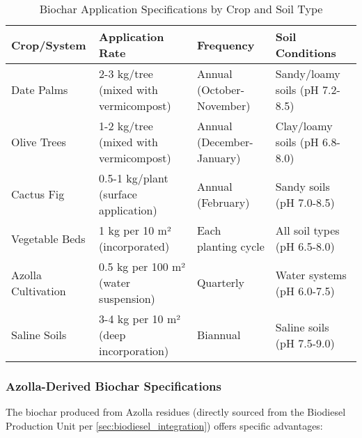\begin{table}[h]
\centering
\begin{tabular}{|p{3cm}|p{3cm}|p{3cm}|p{3cm}|}
\hline
\textbf{Crop/System} & \textbf{Application Rate} & \textbf{Frequency} & \textbf{Soil Conditions} \\
\hline
Date Palms & 2-3 kg/tree (mixed with vermicompost) & Annual (October-November) & Sandy/loamy soils (pH 7.2-8.5) \\
\hline
Olive Trees & 1-2 kg/tree (mixed with vermicompost) & Annual (December-January) & Clay/loamy soils (pH 6.8-8.0) \\
\hline
Cactus Fig & 0.5-1 kg/plant (surface application) & Annual (February) & Sandy soils (pH 7.0-8.5) \\
\hline
Vegetable Beds & 1 kg per 10 m² (incorporated) & Each planting cycle & All soil types (pH 6.5-8.0) \\
\hline
Azolla Cultivation & 0.5 kg per 100 m² (water suspension) & Quarterly & Water systems (pH 6.0-7.5) \\
\hline
Saline Soils & 3-4 kg per 10 m² (deep incorporation) & Biannual & Saline soils (pH 7.5-9.0) \\
\hline
\end{tabular}
\caption{Biochar Application Specifications by Crop and Soil Type}
\end{table}

\subsubsection{Azolla-Derived Biochar Specifications}

The biochar produced from Azolla residues (directly sourced from the Biodiesel Production Unit per \ref{sec:biodiesel_integration}) offers specific advantages:

